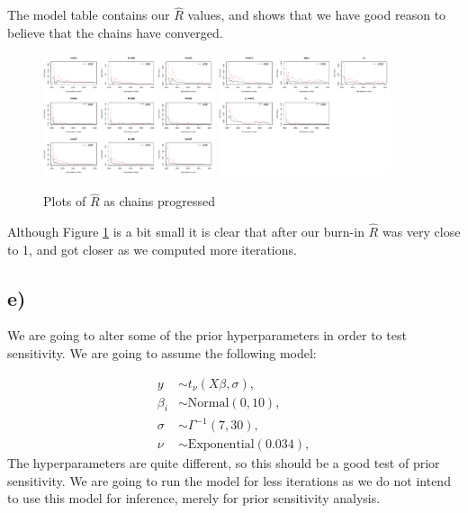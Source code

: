 \documentclass[10pt]{extarticle}
\begin{document}
The model table contains our $\hat{R}$ values, and shows that we have good reason to believe that the chains have converged. 

\begin{figure}[H]
	\centering
	\includegraphics[width = 0.45\textwidth]{../gelman1}
	\includegraphics[width = 0.45\textwidth]{../gelman2}
	\caption{Plots of $\hat{R}$ as chains progressed}
	\label{fig:gelmanplots}
\end{figure}

Although Figure \ref{fig:gelmanplots} is a bit small it is clear that after our burn-in $\hat{R}$ was very close to 1, and got closer as we computed more iterations.

\subsection*{e)}

We are going to alter some of the prior hyperparameters in order to test sensitivity. We are going to assume the following model:

\begin{align*}
y &\sim t_\nu(X\beta, \sigma),\\
\beta_i & \sim \mathrm{Normal}(0, 10),\\
\sigma &\sim \Gamma^{-1}(7, 30),\\
\nu &\sim \mathrm{Exponential}(0.034),
\end{align*}
The hyperparameters are quite different, so this should be a good test of prior sensitivity. We are going to run the model for less iterations as we do not intend to use this model for inference, merely for prior sensitivity analysis.
\end{document}
